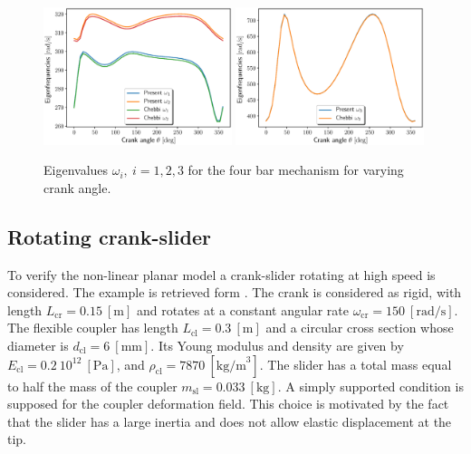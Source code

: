 \documentclass{svjour3}                     %
\begin{document}
\begin{figure}[tb]
	\centering
	\includegraphics[width=0.49\textwidth]{FourBar_Om12_Chebby.eps} 
	\includegraphics[width=0.49\textwidth]{FourBar_Om3_Chebby.eps} 
	\caption{Eigenvalues $\omega_i, \ i=1,2,3$ for the four bar mechanism for varying crank angle.}
	\label{fig:omega_4bars}
\end{figure}

\subsection{Rotating crank-slider}
To verify the non-linear planar model a crank-slider rotating at high speed is considered. The example is retrieved form \cite{Ellenbroek2018}.  The crank is considered as rigid, with length $L_{\text{cr}} = 0.15 \ [\mathrm{m}]$ and rotates at a constant angular rate $\omega_{\text{cr}} = 150 \ [\mathrm{rad/s}]$. The flexible coupler has length $L_{\text{cl}} = 0.3 \ [\mathrm{m}]$ and a circular cross section whose diameter is $d_{\text{cl}} = 6 \ [\mathrm{mm}]$. Its Young modulus and density are given by $E_{\text{cl}}=0.2 \ 10^{12} \ [\mathrm{Pa}]$, and $\rho_{\text{cl}}=7870 \ [\mathrm{kg/m}^3]$. The slider has a total mass equal to half the mass of the coupler $m_{\text{sl}} = 0.033 \ [\mathrm{kg}]$. A simply supported condition is supposed for the coupler deformation field. This choice is motivated by the fact that the slider has a large inertia and does not allow elastic displacement at the tip.
\end{document}
